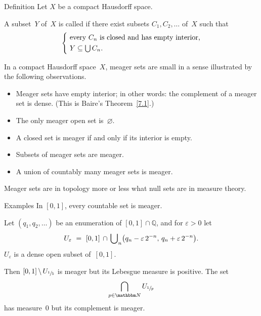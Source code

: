 \documentclass[main.tex]{subfiles}
\begin{document}
%
%
\begin{psec}{7.2}{Definition}
Let $X$ be a compact Hausdorff space.

A subset~$Y$ of~$X$ is called 
if there exist subsets $C_1,C_2,\dotsc$ of~$X$ such that
\begin{equation*}
\left\{\ 
\begin{aligned}
& \htam{every }C_n\htam{ is closed and has empty interior,} \\
& \textstyle Y\subseteq \bigcup C_n\htam{.}
\end{aligned}
\right.
\end{equation*}
\end{psec}
%
%
\begin{psec}{7.3}%
In a compact Hausdorff space~$X$,
meager sets are small in a sense illustrated by the following observations.
\begin{itemize}[itemindent=1.2em]
\item
Meager sets have empty interior;
in other words:
the complement of a meager set is dense.
(This is Baire's Theorem~\ref{7.1}.)
%
\item
The only meager open set is~$\varnothing$.
%
\item
A closed set is meager
if and only if its interior is empty.
%
\item
Subsets of meager sets are meager.
%
\item
A union of countably many meager sets is meager.
\end{itemize}

Meager sets are in topology
more or less what null sets are in measure theory.
\end{psec}
%
%
\begin{psec}{7.4}{Examples}
In $[0,1]$,
every countable set is meager.

Let $(q_1,q_2,\dotsc)$ be an enumeration of $[0,1]\cap\mathbb{Q}$,
and for $\varepsilon>0$ let
\begin{equation*}
U_\varepsilon\ =\ [0,1]\,\cap\,{\bigcup}_n
  \bigl(q_n-\varepsilon\, 2^{-n},\, q_n +\varepsilon\, 2^{-n}\bigr)\htam{.}
\end{equation*}
$U_\varepsilon$ is a dense open subset of~$[0,1]$.

Then $[0,1]\,\backslash\, U_{\sfrac{1}{5}}$ is meager
but its Lebesgue measure is positive.
The set
\begin{equation*}
\bigcap_{p\in\N} U_{\sfrac{1}{p}}
\end{equation*}
has measure~$0$ but its complement is meager.
\end{psec}
\end{document}
